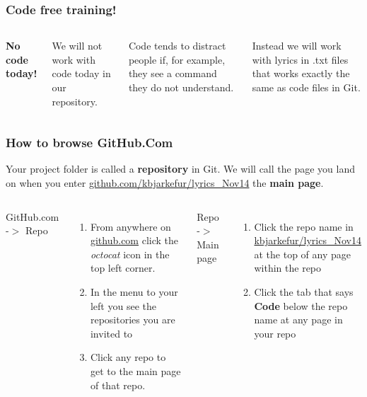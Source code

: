 \documentclass[aspectratio=169]{beamer} %
\newcommand{\trainingURL}[1]{{\color{blue}\url{#1}}}
\newcommand{\traininerUsername}{kbjarkefur}
\newcommand{\repoName}{\traininerUsername/lyrics\_Nov14}
\newcommand{\trainingRepoURL}[1]{\trainingURL{github.com/\repoName #1}}
\begin{document}
\begin{frame}
\frametitle{Code free training!}

	\begin{columns}[c] 
		
		
		\textbf{No code today!}
		
		\vspace{.5cm}
		
		We will not work with code today in our repository.
		
		\vspace{.25cm}
		
		Code tends to distract people if, for example, they see a command they do not understand. 
		
		\vspace{.25cm}
		
		Instead we will work with lyrics in .txt files that works exactly the same as code files in Git.
		
		
	\end{columns}
\end{frame}

\begin{frame}
\frametitle{How to browse GitHub.Com}

	Your project folder is called a \textbf{repository} in Git. We will call the page you land on when you enter \trainingRepoURL{} the \textbf{main page}.
	
	\vspace{.5cm}

	\begin{columns}[T] 
	
		GitHub.com -$>$ Repo
		\begin{enumerate}
			\item From anywhere on \url{github.com} click the \textit{octocat} icon in the top left corner.
			\item In the menu to your left you see the repositories you are invited to
			\item Click any repo to get to the main page of that repo.
		\end{enumerate}
		
		Repo -$>$ Main page
		\begin{enumerate}
			\item Click the repo name in {\color{blue}\url{\repoName}} at the top of any page within the repo
			\item Click the tab that says \textbf{Code} below the repo name at any page in your repo
		\end{enumerate}
			
	\end{columns}
\end{frame}
\end{document}
